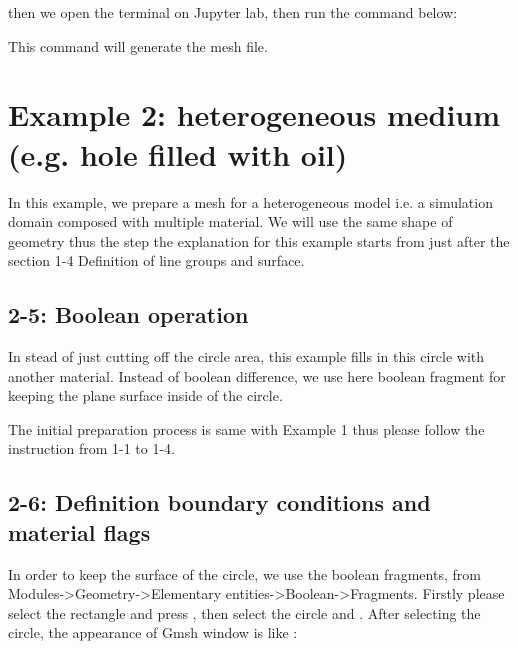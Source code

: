 \documentclass[letterpaper,10pt,english]{sphinxmanual}
\begin{document}
\begin{sphinxVerbatim}[commandchars=\\\{\}]
  
\end{sphinxVerbatim}

then we open the terminal on Jupyter lab, then run the command below:


This command will generate the mesh file.


\section{Example 2: heterogeneous medium  (e.g. hole filled with oil)}
\label{\detokenize{meshing:example-2-heterogeneous-medium-e-g-hole-filled-with-oil}}
In this example, we prepare a mesh for a heterogeneous model i.e. a simulation domain composed with multiple material.
We will use the same shape of geometry thus the step the explanation for this example starts from just after the section 1-4 Definition of line groups and surface.


\subsection{2-5: Boolean operation}
\label{\detokenize{meshing:id1}}
In stead of just cutting off the circle area, this example fills in this circle with another material.
Instead of boolean difference, we use here boolean fragment for keeping the plane surface inside of the circle.

The initial preparation process is same with Example 1 thus please follow the instruction from 1-1 to 1-4.


\subsection{2-6: Definition boundary conditions and material flags}
\label{\detokenize{meshing:id2}}
In order to keep the surface of the circle, we use the boolean fragments, from Modules-\textgreater{}Geometry-\textgreater{}Elementary entities-\textgreater{}Boolean-\textgreater{}Fragments.
Firstly please select the rectangle and press , then select the circle and . After selecting the circle, the appearance of Gmsh window is like :
\end{document}
